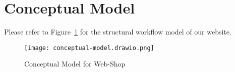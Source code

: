\section{Conceptual Model}
Please refer to  Figure~\ref{fig:task2} for the structural workflow model of our website.

\begin{figure}[h]
    \centering
    \texttt{[image: conceptual-model.drawio.png]} %
    \caption{Conceptual Model for Web-Shop}
    \label{fig:task2}
\end{figure}